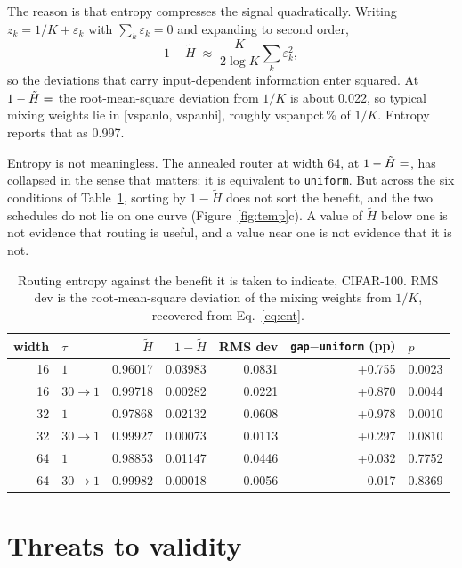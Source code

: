 \documentclass[10pt,a4paper]{article}
\newcommand{\V}[1]{\csname v#1\endcsname}
\begin{document}
The reason is that entropy compresses the signal quadratically. Writing
$z_k=1/K+\varepsilon_k$ with $\sum_k\varepsilon_k=0$ and expanding to
second order,
\begin{equation}
1-\tilde H\;\approx\;\frac{K}{2\log K}\sum_k\varepsilon_k^{2},
\label{eq:ent}
\end{equation}
so the deviations that carry input-dependent information enter squared.
At $1-\tilde H=\V{haA}$ the root-mean-square deviation from $1/K$ is
about 0.022, so typical mixing weights lie in
[\V{spanlo}, \V{spanhi}], roughly \V{spanpct}\,\% of $1/K$.
Entropy reports that as 0.997.

Entropy is not meaningless. The annealed router at width 64, at
$1-\tilde H=\V{haC}$, has collapsed in the sense that matters: it is
equivalent to \texttt{uniform}. But across the six conditions of
Table~\ref{tab:entben}, sorting by $1-\tilde H$ does not sort the
benefit, and the two schedules do not lie on one curve
(Figure~\ref{fig:temp}c). A value of $\tilde H$ below one is not evidence
that routing is useful, and a value near one is not evidence that it is
not.

\begin{table}[t]\centering\small
\caption{Routing entropy against the benefit it is taken to indicate,
CIFAR-100. RMS dev is the root-mean-square deviation of the mixing
weights from $1/K$, recovered from Eq.~\eqref{eq:ent}.}
\label{tab:entben}
\begin{tabular}{r l rrr rl}
\toprule
width & $\tau$ & $\tilde H$ & $1-\tilde H$ & RMS dev & \texttt{gap}$-$\texttt{uniform} (pp) & $p$ \\
\midrule
16 & $1$ & 0.96017 & 0.03983 & 0.0831 & +0.755 & 0.0023 \\
16 & $30\!\to\!1$ & 0.99718 & 0.00282 & 0.0221 & +0.870 & 0.0044 \\
32 & $1$ & 0.97868 & 0.02132 & 0.0608 & +0.978 & 0.0010 \\
32 & $30\!\to\!1$ & 0.99927 & 0.00073 & 0.0113 & +0.297 & 0.0810 \\
64 & $1$ & 0.98853 & 0.01147 & 0.0446 & +0.032 & 0.7752 \\
64 & $30\!\to\!1$ & 0.99982 & 0.00018 & 0.0056 & -0.017 & 0.8369 \\
\bottomrule
\end{tabular}
\end{table}

\section{Threats to validity}
\end{document}
